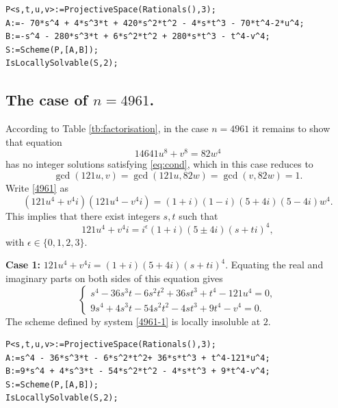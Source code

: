 \documentclass[a4paper,12pt,english,reqno]{amsart}
\begin{document}
\begin{lstlisting}
P<s,t,u,v>:=ProjectiveSpace(Rationals(),3);
A:=- 70*s^4 + 4*s^3*t + 420*s^2*t^2 - 4*s*t^3 - 70*t^4-2*u^4;
B:=-s^4 - 280*s^3*t + 6*s^2*t^2 + 280*s*t^3 - t^4-v^4;
S:=Scheme(P,[A,B]);
IsLocallySolvable(S,2);
\end{lstlisting}


\subsection{The case of $n=4961$.} %
According to Table \ref{tb:factorisation}, in the case $n=4961$ it remains to
show that equation 
\begin{equation}\label{4961}
14641u^8+v^8=82 w^4
\end{equation}
has no integer solutions satisfying \eqref{eq:cond}, which in this case reduces to \[\gcd(121u,v)=\gcd(121u,82w)=\gcd(v,82w)=1.\]
Write \eqref{4961} as
\begin{equation} (121u^4+v^4i)(121u^4-v^4i)=(1+i)(1-i)(5+4i)(5-4i)w^4.
\end{equation}
This implies that there exist integers $s,t$ such that
\[121u^4+v^4i=i^{\epsilon}(1+i)(5\pm 4i)(s+ti)^4,\]
with $\epsilon \in \{0,1,2,3\}$.



{\bf Case 1:} $121u^4+v^4i=(1+i)(5+ 4i)(s+ti)^4$. Equating the real and imaginary parts on both sides of this equation gives
\begin{equation}\label{4961-1}
\begin{cases}
s^4 - 36s^3t - 6s^2t^2 + 36st^3 + t^4 - 121u^4=0,\\
9s^4 + 4s^3t - 54s^2t^2 - 4st^3 + 9t^4 - v^4=0.
\end{cases}
\end{equation}
The scheme defined by system \eqref{4961-1} is locally insoluble at $2$.


\begin{lstlisting}
P<s,t,u,v>:=ProjectiveSpace(Rationals(),3);
A:=s^4 - 36*s^3*t - 6*s^2*t^2+ 36*s*t^3 + t^4-121*u^4;
B:=9*s^4 + 4*s^3*t - 54*s^2*t^2 - 4*s*t^3 + 9*t^4-v^4;
S:=Scheme(P,[A,B]);
IsLocallySolvable(S,2);
\end{lstlisting}
\end{document}
